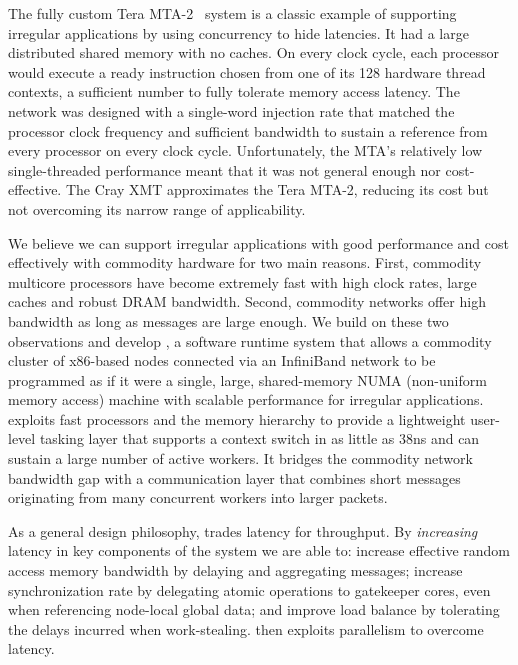 The fully custom Tera MTA-2~\cite{tera:mta1} system is a classic example of
supporting irregular applications by using concurrency to hide latencies. It
had a large distributed shared memory with no caches. On every clock cycle,
each processor would execute a ready instruction chosen from one of its 128
hardware thread contexts, a sufficient number to fully tolerate memory access
latency. The network was designed with a single-word injection rate that
matched the processor clock frequency and sufficient bandwidth to sustain a
reference from every processor on every clock cycle. Unfortunately, the MTA's relatively low single-threaded performance meant that it
was not general enough nor cost-effective. The Cray XMT approximates the Tera
MTA-2, reducing its cost but not overcoming its narrow range of applicability.

We believe we can support irregular applications with good performance and cost effectively with commodity hardware for two main reasons. First, commodity multicore processors have become extremely fast with high clock rates, large caches and robust DRAM bandwidth. Second, commodity networks offer high bandwidth as long as messages are large enough. We build on these two observations and develop \Grappa, a software runtime system that allows a commodity cluster of x86-based nodes connected via an InfiniBand network to be programmed as if it were a single, large, shared-memory NUMA (non-uniform memory access) machine with scalable performance for irregular applications. \Grappa exploits fast processors and the memory hierarchy to provide a lightweight user-level tasking layer that supports a context switch in as little as 38ns and can sustain a large number of active workers. It bridges the commodity network bandwidth gap with a communication layer that combines short messages originating from many concurrent workers into larger packets.

As a general design philosophy, \Grappa trades latency for throughput.  By \emph{increasing} latency in key components of the system we are able to: increase effective random access memory bandwidth by delaying and aggregating messages; increase synchronization rate by delegating atomic operations to gatekeeper cores, even when referencing node-local global data; and improve load balance by tolerating the delays incurred when work-stealing.  \Grappa then exploits parallelism to overcome latency.

